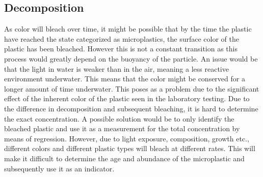\subsection{Decomposition}
As color will bleach over time, it might be possible that by the time the plastic have reached the state categorized as microplastics, the surface color of the plastic has been bleached. However this is not a constant transition as this process would greatly depend on the buoyancy of the particle. An issue would be that the light in water is weaker than in the air, meaning a less reactive environment underwater. This means that the color might be conserved for a longer amount of time underwater. This poses as a problem due to the significant effect of the inherent color of the plastic seen in the laboratory testing. Due to the difference in decomposition and subsequent bleaching, it is hard to determine the exact concentration. A possible solution would be to only identify the bleached plastic and use it as a measurement for the total concentration by means of regression. However, due to light exposure, composition, growth etc., different colors and different plastic types will bleach at different rates. This will make it difficult to determine the age and abundance of the microplastic and subsequently use it as an indicator.


